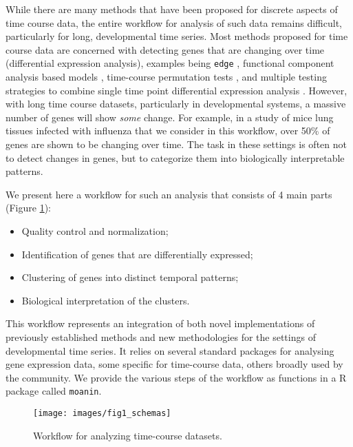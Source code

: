\documentclass[9pt,a4paper,]{extarticle}
\begin{document}
While there are many methods that have been proposed for discrete aspects of
time course data, the entire workflow for analysis of such data remains
difficult, particularly for long, developmental time series. Most methods
proposed for time course data are concerned with detecting genes that are
changing over time (differential expression analysis), examples being \texttt{edge}
\citep{storey:significance}, functional component analysis based models \citep{wu:more},
time-course permutation tests \citep{park:statistical}, and multiple testing
strategies to combine single time point differential expression analysis
\citep{sun:multiple}. However, with long time course datasets, particularly in
developmental systems, a massive number of genes will show \emph{some} change. For
example, in a study of mice lung tissues infected with influenza that we
consider in this workflow, over 50\% of genes
are shown to be changing over time. The task in these settings is often not to
detect changes in genes, but to categorize them into biologically interpretable
patterns.

We present here a workflow for such an analysis that consists of 4 main
parts (Figure \ref{fig:schema}):

\begin{itemize}
\tightlist
\item
  Quality control and normalization;
\item
  Identification of genes that are differentially expressed;
\item
  Clustering of genes into distinct temporal patterns;
\item
  Biological interpretation of the clusters.
\end{itemize}

This workflow represents an integration of both novel implementations of
previously established methods and new methodologies for the settings of
developmental time series. It relies on several standard packages for
analysing gene expression data, some specific for time-course data, others
broadly used by the community. We provide the various steps of the workflow as
functions in a R package called \texttt{moanin}.

\begin{figure}

{\centering \texttt{[image: images/fig1\_schemas]} 

}

\caption{Workflow for analyzing time-course datasets.}\label{fig:schema}
\end{figure}
\end{document}
